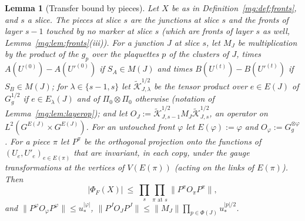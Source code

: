 \documentclass[11pt,a4paper]{article}
\newtheorem{lemma}[theorem]{Lemma}
\theoremstyle{definition}
\theoremstyle{remark}
\newcommand{\norm}[1]{\lVert #1\rVert}
\begin{document}
\begin{lemma}[Transfer bound by pieces]\label{mg:lem:pieces}
Let $X$ be as in Definition~\ref{mg:def:fronts}, and $s$ a slice. The \emph{pieces} at slice $s$ are the junctions at slice $s$ and the fronts of
layer $s-1$ touched by no marker at slice $s$ (which are fronts of layer $s$ as well, Lemma~\ref{mg:lem:fronts}(iii)). For a junction $J$ at slice
$s$, let $M_J$ be multiplication by the product of the $g_p$ over the plaquettes $p$ of the clusters of $J$, times $A(U^{(0)})-A(U'^{(0)})$ if
$S_A\in M(J)$ and times $B(U^{(t)})-B(U'^{(t)})$ if $S_B\in M(J)$; for $\lambda\in\{s-1,s\}$ let $\tilde{\mathcal K}^{1/2}_{J,\lambda}$ be the tensor product over $e\in E(J)$ of
$G_g^{1/2}$ if $e\in E_\lambda(J)$ and of $\Pi_0\otimes\Pi_0$ otherwise (notation of Lemma~\ref{mg:lem:layerop}); and let $O_J:=\tilde{\mathcal K}^{1/2}_{J,s-1}M_J\tilde{\mathcal K}^{1/2}_{J,s}$,
an operator on $L^2(G^{E(J)}\times G^{E(J)})$. For an untouched front $\varphi$ let $E(\varphi):=\varphi$ and $O_\varphi:=G_g^{\otimes\varphi}$. For a
piece $\pi$ let $P^\pi$ be the orthogonal projection onto the functions of $(U_e,U'_e)_{e\in E(\pi)}$ that are invariant, in each copy, under the gauge
transformations at the vertices of $V(E(\pi))$ (acting on the links of $E(\pi)$). Then
\[
|\Phi_F(X)|\ \le\ \prod_s\prod_{\pi\text{ at }s}\norm{P^\pi O_\pi P^\pi},
\]
and $\norm{P^\varphi O_\varphi P^\varphi}\le u_*^{|\varphi|}$, $\norm{P^JO_JP^J}\le\norm{M_J}\prod_{p\in\Phi(J)}u_*^{|p|/2}$.
\end{lemma}
\end{document}
